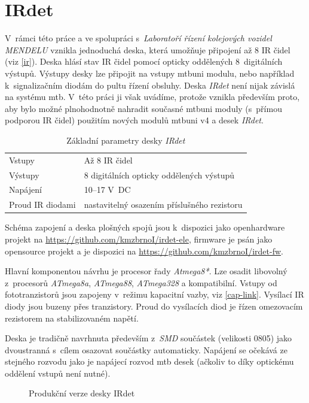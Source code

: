 \section{IRdet}

V~rámci této práce a ve spolupráci s~\textit{Laboratoří řízení kolejových
vozidel MENDELU} vznikla jednoduchá deska, která umožňuje připojení až 8 IR
čidel (viz \ref{ir}). Deska hlásí stav IR čidel pomocí opticky oddělených
8~digitálních výstupů. Výstupy desky lze připojit na vstupy \gls{mtbuni}
modulu, nebo například k~signalizačním diodám do pultu řízení obsluhy.
Deska \textit{IRdet} není nijak závislá na systému \gls{mtb}. V~této práci ji
však uvádíme, protože vznikla především proto, aby bylo možné plnohodnotně
nahradit současné \gls{mtbuni} moduly (s~přímou podporou IR čidel) použitím
nových modulů \gls{mtbuni} v4 a desek \textit{IRdet}.

\begin{table}[h]
	\begin{tabularx}{\textwidth}{lX}
		\toprule
		Vstupy & Až 8 IR čidel \\
		Výstupy & 8 digitálních opticky oddělených výstupů \\
		Napájení & 10–17 V~DC \\
		Proud IR diodami & nastavitelný osazením příslušného rezistoru \\
		\bottomrule
	\end{tabularx}
	\caption{Základní parametry desky \textit{IRdet}}
	\label{tab:mtbuni-params}
\end{table}

Schéma zapojení a deska plošných spojů jsou k~dispozici jako openhardware
projekt na \url{https://github.com/kmzbrnoI/irdet-ele}, firmware je psán jako
opensource projekt a je dispozici na
\url{https://github.com/kmzbrnoI/irdet-fw}.

Hlavní komponentou návrhu je procesor řady \textit{Atmega8*}. Lze osadit
libovolný z~procesorů \textit{ATmega8a}, \textit{ATmega88}, \textit{ATmega328}
a kompatibilní. Vstupy od fototranzistorů jsou zapojeny v~režimu kapacitní
vazby, viz \ref{cap-link}. Vysílací IR diody jsou buzeny přes tranzistory.
Proud do vysílacích diod je řízen omezovacím rezistorem na stabilizovaném
napětí.

Deska je tradičně navrhnuta především z~\textit{SMD} součástek (velikosti 0805)
jako dvoustranná s~cílem osazovat součástky automaticky. Napájení se očekává
ze stejného rozvodu jako je napájecí rozvod \gls{mtb} desek (ačkoliv to díky
optickému oddělení vstupů není nutné).

\begin{figure}[ht]
\caption{Produkční verze desky IRdet}
\label{fig:irdet}
\end{figure}
